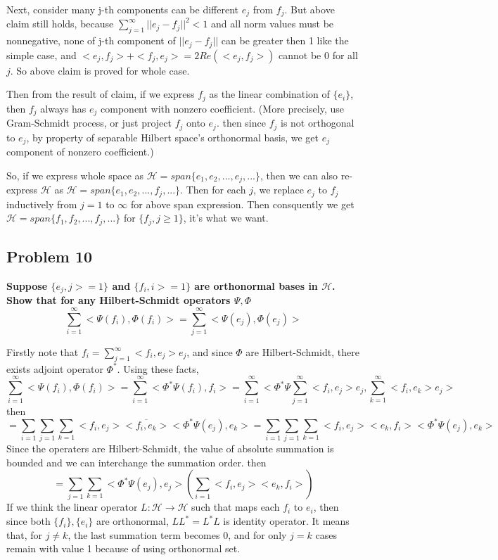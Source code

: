 \documentclass{article}
\begin{document}
Next, consider many j-th components can be different $e_j$ from $f_j$. But above claim still holds, because
\(\sum_{j=1}^\infty ||e_j-f_j||^2<1\) and all norm values must be nonnegative,
none of j-th component of $||e_j-f_j||$ can be greater then 1 like the simple case, 
and $<e_j,f_j>+<f_j,e_j>=2Re(<e_j,f_j>)$ cannot be 0 for all $j$.
So above claim is proved for whole case.


Then from the result of claim, if we express $f_j$ as the linear combination of $\{e_i\}$, 
then $f_j$ always has $e_j$ component with nonzero coefficient.
(More precisely, use Gram-Schmidt process, or just project $f_j$ onto $e_j$.
then since $f_j$ is not orthogonal to $e_j$, by property of separable Hilbert space's orthonormal basis,
we get $e_j$ component of nonzero coefficient.)

So, if we express whole space as \(\mathcal{H}=span\{e_1,e_2,...,e_j,...\}\), then
we can also re-express $\mathcal{H}$ as \(\mathcal{H}=span\{e_1,e_2,...,f_j,...\}\).
Then for each $j$, we replace $e_j$ to $f_j$ inductively from $j=1$ to $\infty$ for above span expression.
Then consquently we get \(\mathcal{H}=span\{f_1,f_2,...,f_j,...\}\) for $\{f_j, j\geq 1\}$, it's what we want.




\subsection{Problem 10}
\textbf{
    Suppose $\{e_j,j>=1\}$ and $\{f_i,i>=1\}$ are orthonormal bases in $\mathcal{H}$.
    Show that for any Hilbert-Schmidt operators $\Psi,\Phi$
    \[\sum_{i=1}^{\infty} <\Psi(f_i), \Phi(f_i)> = \sum_{j=1}^{\infty} <\Psi(e_j),\Phi(e_j)>\]
}

Firstly note that $f_i=\sum_{j=1}^\infty<f_i,e_j>e_j$, 
and since $\Phi$ are Hilbert-Schmidt, there exists adjoint operator  $\Phi^*$.
Using these facts,
\[\sum_{i=1}^{\infty} <\Psi(f_i), \Phi(f_i)>
= \sum_{i=1}^{\infty} <\Phi^*\Psi(f_i), f_i> 
= \sum_{i=1}^\infty <\Phi^*\Psi\sum_{j=1}^\infty <f_i,e_j>e_j, \sum_{k=1}^\infty <f_i,e_k>e_j>\]
then
\[=\sum _{i=1}\sum_{j=1}\sum_{k=1}<f_i,e_j>\overline{<f_i,e_k>}<\Phi^*\Psi(e_j),e_k>
=\sum _{i=1}\sum_{j=1}\sum_{k=1}<f_i,e_j><e_k,f_i><\Phi^*\Psi(e_j),e_k>\]
Since the operaters are Hilbert-Schmidt, the value of absolute summation is bounded
and we can interchange the summation order. then
\[=\sum_{j=1}\sum_{k=1}<\Phi^*\Psi(e_j),e_j>(\sum_{i=1}<f_i,e_j><e_k,f_i>)\]
If we think the linear operator $L:\mathcal{H}\rightarrow\mathcal{H}$ such that
maps each $f_i$ to $e_i$, then since both $\{f_i\}, \{e_i\}$ are orthonormal, 
$LL^*=L^*L$ is identity operator.
It means that, for $j\neq k$, the last summation term becomes 0,
and for only $j=k$ cases remain with value 1 because of using orthonormal set.
\end{document}
